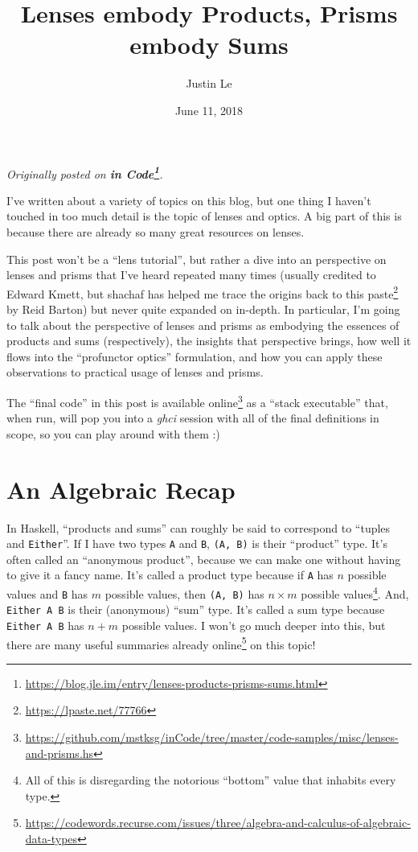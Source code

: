 \documentclass[]{article}
\title{Lenses embody Products, Prisms embody Sums}
\author{Justin Le}
\date{June 11, 2018}
\renewcommand{\href}[2]{#2\footnote{\url{#1}}}
\begin{document}
\maketitle

\emph{Originally posted on
\textbf{\href{https://blog.jle.im/entry/lenses-products-prisms-sums.html}{in
Code}}.}

I've written about a variety of topics on this blog, but one thing I haven't
touched in too much detail is the topic of lenses and optics. A big part of this
is because there are already so many great resources on lenses.

This post won't be a ``lens tutorial'', but rather a dive into an perspective on
lenses and prisms that I've heard repeated many times (usually credited to
Edward Kmett, but shachaf has helped me trace the origins back to
\href{https://lpaste.net/77766}{this paste} by Reid Barton) but never quite
expanded on in-depth. In particular, I'm going to talk about the perspective of
lenses and prisms as embodying the essences of products and sums (respectively),
the insights that perspective brings, how well it flows into the ``profunctor
optics'' formulation, and how you can apply these observations to practical
usage of lenses and prisms.

The ``final code'' in this post is
\href{https://github.com/mstksg/inCode/tree/master/code-samples/misc/lenses-and-prisms.hs}{available
online} as a ``stack executable'' that, when run, will pop you into a
\emph{ghci} session with all of the final definitions in scope, so you can play
around with them :)

\hypertarget{an-algebraic-recap}{%
\section{An Algebraic Recap}\label{an-algebraic-recap}}

In Haskell, ``products and sums'' can roughly be said to correspond to ``tuples
and \texttt{Either}''. If I have two types \texttt{A} and \texttt{B},
\texttt{(A,\ B)} is their ``product'' type. It's often called an ``anonymous
product'', because we can make one without having to give it a fancy name. It's
called a product type because if \texttt{A} has \(n\) possible values and
\texttt{B} has \(m\) possible values, then \texttt{(A,\ B)} has \(n \times m\)
possible values\footnote{All of this is disregarding the notorious ``bottom''
  value that inhabits every type.}. And, \texttt{Either\ A\ B} is their
(anonymous) ``sum'' type. It's called a sum type because \texttt{Either\ A\ B}
has \(n + m\) possible values. I won't go much deeper into this, but there are
\href{https://codewords.recurse.com/issues/three/algebra-and-calculus-of-algebraic-data-types}{many
useful summaries already online} on this topic!
\end{document}
